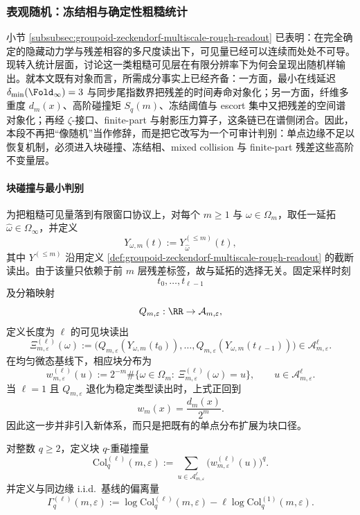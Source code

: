 \subsubsection{表观随机：冻结相与确定性粗糙统计}\label{subsubsec:frt-apparent-randomness-freezing-rough-statistics}

小节 \ref{subsubsec:groupoid-zeckendorf-multiscale-rough-readout} 已表明：在完全确定的隐藏动力学与残差相容的多尺度读出下，可见量已经可以连续而处处不可导。现转入统计层面，讨论这一类粗糙可见层在有限分辨率下为何会呈现出随机样输出。就本文既有对象而言，所需成分事实上已经齐备：一方面，最小在线延迟 \(\delta_{\min}(\Fold_\infty)=3\) 与同步尾指数界把残差的时间寿命对象化；另一方面，纤维多重度 \(d_m(x)\)、高阶碰撞矩 \(S_q(m)\)、冻结阈值与 escort 集中又把残差的空间谱对象化；再经 \(\zeta\)-接口、finite-part 与射影压力算子，这条链已在谱侧闭合。因此，本段不再把“像随机”当作修辞，而是把它改写为一个可审计判别：单点边缘不足以恢复机制，必须进入块碰撞、冻结相、mixed collision 与 finite-part 残差这些高阶不变量层。

\paragraph{块碰撞与最小判别}
为把粗糙可见量落到有限窗口协议上，对每个 \(m\ge 1\) 与 \(\omega\in\Omega_m\)，取任一延拓 \(\widehat\omega\in\Omega_\infty\)，并定义
\[
Y_{\omega,m}(t):=Y^{(\le m)}_{\widehat\omega}(t),
\]
其中 \(Y^{(\le m)}\) 沿用定义 \ref{def:groupoid-zeckendorf-multiscale-rough-readout} 的截断读出。由于该量只依赖于前 \(m\) 层残差标签，故与延拓的选择无关。固定采样时刻
\[
t_0,\dots,t_{\ell-1}
\]
及分箱映射
\[
Q_{m,\varepsilon}:\RR\to \mathcal A_{m,\varepsilon},
\]
定义长度为 \(\ell\) 的可见块读出
\[
\Xi^{(\ell)}_{m,\varepsilon}(\omega)
:=
\bigl(
Q_{m,\varepsilon}(Y_{\omega,m}(t_0)),
\dots,
Q_{m,\varepsilon}(Y_{\omega,m}(t_{\ell-1}))
\bigr)
\in \mathcal A_{m,\varepsilon}^{\ell}.
\]
在均匀微态基线下，相应块分布为
\[
w^{(\ell)}_{m,\varepsilon}(u)
:=
2^{-m}\#\bigl\{\omega\in\Omega_m:\ \Xi^{(\ell)}_{m,\varepsilon}(\omega)=u\bigr\},
\qquad
u\in \mathcal A_{m,\varepsilon}^{\ell}.
\]
当 \(\ell=1\) 且 \(Q_{m,\varepsilon}\) 退化为稳定类型读出时，上式正回到
\[
w_m(x)=\frac{d_m(x)}{2^m}.
\]
因此这一步并非引入新体系，而只是把既有的单点分布扩展为块口径。

\begin{definition}[块碰撞量与块缺口]\label{def:frt-block-collision-gap}
对整数 \(q\ge 2\)，定义块 \(q\)-重碰撞量
\[
\mathrm{Col}^{(\ell)}_q(m,\varepsilon)
:=
\sum_{u\in \mathcal A_{m,\varepsilon}^{\ell}}
\bigl(w^{(\ell)}_{m,\varepsilon}(u)\bigr)^q.
\]
并定义与同边缘 i.i.d.\ 基线的偏离量
\[
\Gamma^{(\ell)}_q(m,\varepsilon)
:=
\log \mathrm{Col}^{(\ell)}_q(m,\varepsilon)
-\ell\log \mathrm{Col}^{(1)}_q(m,\varepsilon).
\]
\end{definition}

